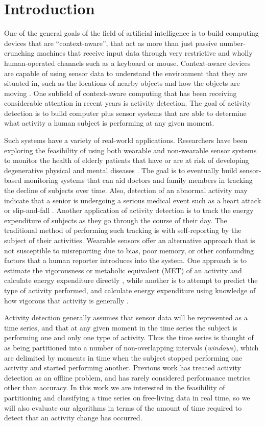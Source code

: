 \chapter{Introduction}
One of the general goals of the field of artificial intelligence is to build
computing devices that are ``context-aware'', that act as
more than just passive number-crunching machines that receive input data through very
restrictive and wholly human-operated channels such as a keyboard or mouse.
Context-aware devices are capable of using sensor data to understand the
environment that they are situated in, such as the locations of nearby objects
and how the objects are moving \cite{abowd99}. One subfield of context-aware
computing that has been receiving considerable attention in recent years is activity
detection. The goal of activity detection is to build computer plus sensor systems
that are able to determine what activity a human subject is performing at any given
moment.

Such systems have a variety of real-world applications. Researchers have been
exploring the feasibility of using both wearable and non-wearable sensor systems to
monitor the health of elderly patients that have or are at risk of developing
degenerative physical and mental diseases \cite{fogarty06}. The goal is to 
eventually build sensor-based monitoring systems that can aid doctors and family
members in tracking the decline of subjects over time. Also, detection of an
abnormal activity may indicate that a senior is undergoing a serious medical
event such as a heart attack or slip-and-fall \cite{wang12}. Another
application of activity detection is to track the energy expenditure
of subjects as they go through the course of their day. The
traditional method of performing such tracking is with self-reporting by the
subject of their activities. Wearable sensors offer an alternative approach that
is not susceptible to misreporting due to bias, poor memory, or other
confounding factors that a human reporter introduces into the system. One
approach is to estimate the vigorousness or metabolic equivalent
(MET) of an activity and calculate energy expenditure directly \cite{staudenmeyer09},
while another is to attempt to predict the type of activity performed, and calculate energy
expenditure using knowledge of how vigorous that activity is generally \cite{trost12}.

Activity detection generally assumes that sensor data will be represented as a
time series, and that at any given moment in the time series the subject is
performing one and only one type of activity. Thus the time series is thought
of as being partitioned into a number of non-overlapping intervals (\emph{windows}), which are
delimited by moments in time when the subject stopped performing one activity
and started performing another. Previous work has treated activity detection as an
offline problem, and has rarely considered performance metrics other than accuracy.
In this work we are interested in the feasibility of partitioning and classifying a time series
on free-living data in real time, so we will also evaluate our algorithms in terms of
the amount of time required to detect that an activity change has occurred.

